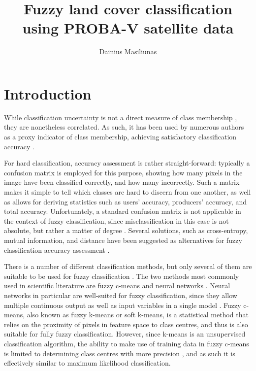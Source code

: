\documentclass[a4paper,10pt]{article}
\title{Fuzzy land cover classification using PROBA-V satellite data}
\author{Dainius Masili\=unas}
\begin{document}
\maketitle

\section{Introduction}

While classification uncertainty is not a direct measure of class membership \cite{sytze2000fuzzyset}, they are nonetheless correlated. As such, it has been used by numerous authors as a proxy indicator of class membership, achieving satisfactory classification accuracy \cite{foody2002accuracy}.

For hard classification, accuracy assessment is rather straight-forward: typically a confusion matrix is employed for this purpose, showing how many pixels in the image have been classified correctly, and how many incorrectly. Such a matrix makes it simple to tell which classes are hard to discern from one another, as well as allows for deriving statistics such as users' accuracy, producers' accuracy, and total accuracy. Unfortunately, a standard confusion matrix is not applicable in the context of fuzzy classification, since misclassification in this case is not absolute, but rather a matter of degree \cite{foody2002accuracy}. Several solutions, such as cross-entropy, mutual information, and distance have been suggested as alternatives for fuzzy classification accuracy assessment \cite{lu2007methods}.

There is a number of different classification methods, but only several of them are suitable to be used for fuzzy classification \cite{nath2014methods}. The two methods most commonly used in scientific literature are fuzzy c-means and neural networks \cite{zhang2001fullyfuzzy}. Neural networks in particular are well-suited for fuzzy classification, since they allow multiple continuous output as well as input variables in a single model \cite{foody1997fuzzynnet}. Fuzzy c-means, also known as fuzzy k-means or soft k-means, is a statistical method that relies on the proximity of pixels in feature space to class centres, and thus is also suitable for fully fuzzy classification. However, since k-means is an unsupervised classification algorithm, the ability to make use of training data in fuzzy c-means is limited to determining class centres with more precision \cite{hengl2004fuzzycmeans}, and as such it is effectively similar to maximum likelihood classification.
\end{document}
